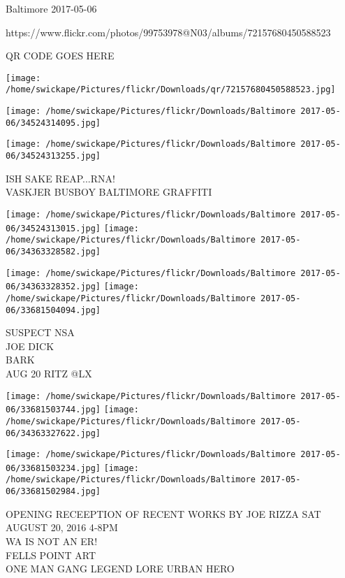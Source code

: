 \documentclass[10pt,letterpaper]{article}
\begin{document}
Baltimore 2017-05-06

https://www.flickr.com/photos/99753978@N03/albums/72157680450588523

QR CODE GOES HERE

\texttt{[image: /home/swickape/Pictures/flickr/Downloads/qr/72157680450588523.jpg]}
\pagebreak

\texttt{[image: /home/swickape/Pictures/flickr/Downloads/Baltimore 2017-05-06/34524314095.jpg]}

\vspace{0.25in}
\texttt{[image: /home/swickape/Pictures/flickr/Downloads/Baltimore 2017-05-06/34524313255.jpg]}

ISH SAKE REAP...RNA!\\
VASKJER BUSBOY BALTIMORE GRAFFITI\\
\pagebreak

\texttt{[image: /home/swickape/Pictures/flickr/Downloads/Baltimore 2017-05-06/34524313015.jpg]}
\texttt{[image: /home/swickape/Pictures/flickr/Downloads/Baltimore 2017-05-06/34363328582.jpg]}

\texttt{[image: /home/swickape/Pictures/flickr/Downloads/Baltimore 2017-05-06/34363328352.jpg]}
\texttt{[image: /home/swickape/Pictures/flickr/Downloads/Baltimore 2017-05-06/33681504094.jpg]}

SUSPECT NSA\\
JOE DICK\\
BARK\\
AUG 20 RITZ @LX\\
\pagebreak

\texttt{[image: /home/swickape/Pictures/flickr/Downloads/Baltimore 2017-05-06/33681503744.jpg]}
\texttt{[image: /home/swickape/Pictures/flickr/Downloads/Baltimore 2017-05-06/34363327622.jpg]}

\texttt{[image: /home/swickape/Pictures/flickr/Downloads/Baltimore 2017-05-06/33681503234.jpg]}
\texttt{[image: /home/swickape/Pictures/flickr/Downloads/Baltimore 2017-05-06/33681502984.jpg]}

OPENING RECEEPTION OF RECENT WORKS BY JOE RIZZA SAT AUGUST 20, 2016 4{-}8PM\\
WA IS NOT AN ER!\\
FELLS POINT ART\\
ONE MAN GANG LEGEND LORE URBAN HERO\\
\pagebreak
\end{document}
